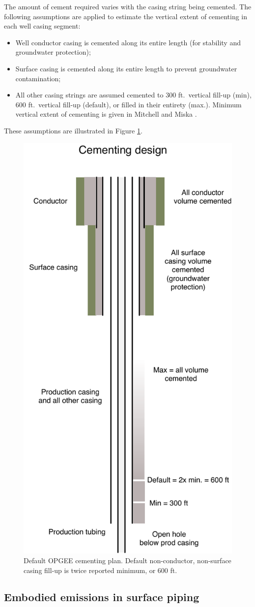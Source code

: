 \documentclass[11pt]{report}
\begin{document}
The amount of cement required varies with the casing string being cemented. The following assumptions are applied to estimate the vertical extent of cementing in each well casing segment:
\begin{itemize}
\item Well conductor casing is cemented along its entire length (for stability and groundwater protection);
\item Surface casing is cemented along its entire length to prevent groundwater contamination;
\item All other casing strings are assumed cemented to 300 ft.\ vertical fill-up (min), 600 ft.\ vertical fill-up (default), or filled in their entirety (max.). Minimum vertical extent of cementing is given in Mitchell and Miska \cite[Section 4.5.11]{Mitchell2011}.
\end{itemize}
These assumptions are illustrated in Figure \ref{fig:cement_diagram}.

\begin{figure}[t]
\includegraphics[width=0.4\columnwidth]{images/cementing_diagram.pdf}
\caption{Default OPGEE cementing plan. Default non-conductor, non-surface casing fill-up is twice reported minimum, or 600 ft.}
\label{fig:cement_diagram}
\end{figure}

\clearpage

\subsection{Embodied emissions in surface piping}
\end{document}
